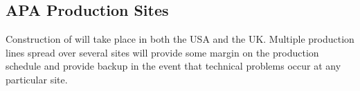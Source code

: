 





\subsection{APA Production Sites}
\label{sec:fdsp-apa-prod-facility}

Construction of   will take place in both the USA and the UK.  Multiple  production lines spread over several sites will provide some margin on the production schedule and provide backup in the event that technical problems occur at any particular site. 

